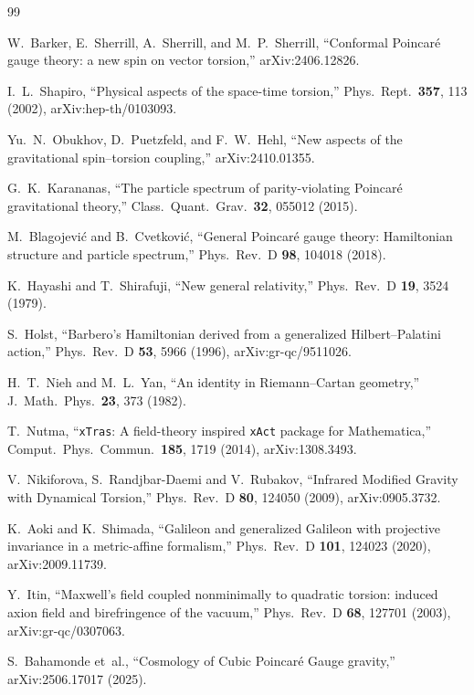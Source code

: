 \documentclass[12pt,a4paper]{article}
\begin{document}
\begin{thebibliography}{99}

W.~Barker, E.~Sherrill, A.~Sherrill, and M.~P.~Sherrill,
``Conformal Poincar\'e gauge theory: a new spin on vector torsion,''
arXiv:2406.12826.

I.~L.~Shapiro,
``Physical aspects of the space-time torsion,''
Phys.\ Rept.\ \textbf{357}, 113 (2002),
arXiv:hep-th/0103093.

Yu.~N.~Obukhov, D.~Puetzfeld, and F.~W.~Hehl,
``New aspects of the gravitational spin--torsion coupling,''
arXiv:2410.01355.

G.~K.~Karananas,
``The particle spectrum of parity-violating Poincar\'e gravitational theory,''
Class.\ Quant.\ Grav.\ \textbf{32}, 055012 (2015).

M.~Blagojevi\'c and B.~Cvetkovi\'c,
``General Poincar\'e gauge theory: Hamiltonian structure and particle spectrum,''
Phys.\ Rev.\ D \textbf{98}, 104018 (2018).

K.~Hayashi and T.~Shirafuji,
``New general relativity,''
Phys.\ Rev.\ D \textbf{19}, 3524 (1979).

S.~Holst,
``Barbero's Hamiltonian derived from a generalized
Hilbert--Palatini action,''
Phys.\ Rev.\ D \textbf{53}, 5966 (1996),
arXiv:gr-qc/9511026.

H.~T.~Nieh and M.~L.~Yan,
``An identity in Riemann--Cartan geometry,''
J.\ Math.\ Phys.\ \textbf{23}, 373 (1982).

T.~Nutma,
``\texttt{xTras}: A field-theory inspired \texttt{xAct} package for
Mathematica,'' Comput.\ Phys.\ Commun.\ \textbf{185}, 1719 (2014),
arXiv:1308.3493.

V.~Nikiforova, S.~Randjbar-Daemi and V.~Rubakov,
``Infrared Modified Gravity with Dynamical Torsion,''
Phys.\ Rev.\ D \textbf{80}, 124050 (2009),
arXiv:0905.3732.

K.~Aoki and K.~Shimada,
``Galileon and generalized Galileon with projective invariance
in a metric-affine formalism,''
Phys.\ Rev.\ D \textbf{101}, 124023 (2020),
arXiv:2009.11739.

Y.~Itin,
``Maxwell's field coupled nonminimally to quadratic torsion:
induced axion field and birefringence of the vacuum,''
Phys.\ Rev.\ D \textbf{68}, 127701 (2003),
arXiv:gr-qc/0307063.

S.~Bahamonde et~al.,
``Cosmology of Cubic Poincar\'{e} Gauge gravity,''
arXiv:2506.17017 (2025).

\end{thebibliography}
\end{document}

